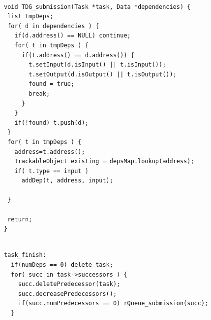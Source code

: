 %
%
%
%


\begin{lstlisting}[float, emph={void,if,return,Dependency,DepList,Data,not,true,and,break}, captionpos=b, caption={Pseudo-code for the SRT loop.},label=SRTloop, emph={[2]mat}, emphstyle={[2]}, aboveskip={0\baselineskip}, frame=tb, belowskip={0\baselineskip}]

void TDG_submission(Task *task, Data *dependencies) {
 list tmpDeps;
 for( d in dependencies ) {
   if(d.address() == NULL) continue;
   for( t in tmpDeps ) {
     if(t.address() == d.address()) {
       t.setInput(d.isInput() || t.isInput());
       t.setOutput(d.isOutput() || t.isOutput());
       found = true;
       break;
     }
   }
   if(!found) t.push(d); 
 }
 for( t in tmpDeps ) {
   address=t.address();
   TrackableObject existing = depsMap.lookup(address);
   if( t.type == input ) 
     addDep(t, address, input);
   
 }
 
 return;
}
\end{lstlisting}
\fi
{}
\begin{lstlisting}[float, emph={void,if,return,rQueue_submission, not,true,and,break}, captionpos=b, caption={Pseudo-code of the task$_$finish runtime activity.},label=task_finish, emph={[2]mat}, emphstyle={[2]}, aboveskip={0\baselineskip}, frame=tb, belowskip={0\baselineskip}]

task_finish:
  if(numDeps == 0) delete task;
  for( succ in task->successors ) {
    succ.deletePredecessor(task);
    succ.decreasePredecessors();
  	if(succ.numPredecessors == 0) rQueue_submission(succ);
  }
\end{lstlisting}
\fi
